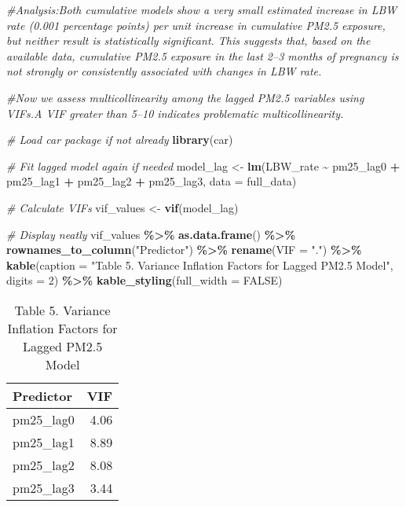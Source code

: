 \documentclass[
]{article}
\newenvironment{Shaded}{\begin{snugshade}}{\end{snugshade}}
\newcommand{\AttributeTok}[1]{\textcolor[rgb]{0.13,0.29,0.53}{#1}}
\newcommand{\CommentTok}[1]{\textcolor[rgb]{0.56,0.35,0.01}{\textit{#1}}}
\newcommand{\ConstantTok}[1]{\textcolor[rgb]{0.56,0.35,0.01}{#1}}
\newcommand{\DecValTok}[1]{\textcolor[rgb]{0.00,0.00,0.81}{#1}}
\newcommand{\FunctionTok}[1]{\textcolor[rgb]{0.13,0.29,0.53}{\textbf{#1}}}
\newcommand{\NormalTok}[1]{#1}
\newcommand{\OtherTok}[1]{\textcolor[rgb]{0.56,0.35,0.01}{#1}}
\newcommand{\SpecialCharTok}[1]{\textcolor[rgb]{0.81,0.36,0.00}{\textbf{#1}}}
\newcommand{\StringTok}[1]{\textcolor[rgb]{0.31,0.60,0.02}{#1}}
\begin{document}
\begin{Shaded}
\begin{Highlighting}[]
\CommentTok{\#Analysis:Both cumulative models show a very small estimated increase in LBW rate (0.001 percentage points) per unit increase in cumulative PM2.5 exposure, but neither result is statistically significant. This suggests that, based on the available data, cumulative PM2.5 exposure in the last 2–3 months of pregnancy is not strongly or consistently associated with changes in LBW rate.}
\end{Highlighting}
\end{Shaded}

\begin{Shaded}
\begin{Highlighting}[]
\CommentTok{\#Now we assess multicollinearity among the lagged PM2.5 variables using VIFs.A VIF greater than 5–10 indicates problematic multicollinearity.}

\CommentTok{\# Load car package if not already}
\FunctionTok{library}\NormalTok{(car)}

\CommentTok{\# Fit lagged model again if needed}
\NormalTok{model\_lag }\OtherTok{\textless{}{-}} \FunctionTok{lm}\NormalTok{(LBW\_rate }\SpecialCharTok{\textasciitilde{}}\NormalTok{ pm25\_lag0 }\SpecialCharTok{+}\NormalTok{ pm25\_lag1 }\SpecialCharTok{+}\NormalTok{ pm25\_lag2 }\SpecialCharTok{+}\NormalTok{ pm25\_lag3, }\AttributeTok{data =}\NormalTok{ full\_data)}

\CommentTok{\# Calculate VIFs}
\NormalTok{vif\_values }\OtherTok{\textless{}{-}} \FunctionTok{vif}\NormalTok{(model\_lag)}

\CommentTok{\# Display neatly}
\NormalTok{vif\_values }\SpecialCharTok{\%\textgreater{}\%}
  \FunctionTok{as.data.frame}\NormalTok{() }\SpecialCharTok{\%\textgreater{}\%}
  \FunctionTok{rownames\_to\_column}\NormalTok{(}\StringTok{"Predictor"}\NormalTok{) }\SpecialCharTok{\%\textgreater{}\%}
  \FunctionTok{rename}\NormalTok{(}\AttributeTok{VIF =} \StringTok{"."}\NormalTok{) }\SpecialCharTok{\%\textgreater{}\%}
  \FunctionTok{kable}\NormalTok{(}\AttributeTok{caption =} \StringTok{"Table 5. Variance Inflation Factors for Lagged PM2.5 Model"}\NormalTok{, }\AttributeTok{digits =} \DecValTok{2}\NormalTok{) }\SpecialCharTok{\%\textgreater{}\%}
  \FunctionTok{kable\_styling}\NormalTok{(}\AttributeTok{full\_width =} \ConstantTok{FALSE}\NormalTok{)}
\end{Highlighting}
\end{Shaded}

\begin{longtable}[t]{lr}
\caption{\label{tab:Multicollinearity Diagnostics}Table 5. Variance Inflation Factors for Lagged PM2.5 Model}\\
\toprule
Predictor & VIF\\
\midrule
pm25\_lag0 & 4.06\\
pm25\_lag1 & 8.89\\
pm25\_lag2 & 8.08\\
pm25\_lag3 & 3.44\\
\bottomrule
\end{longtable}
\end{document}
